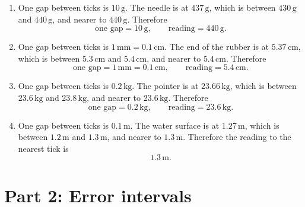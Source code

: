 \documentclass[11pt,a4paper]{article}
\begin{document}
\begin{enumerate}[label=\textbf{Q\arabic*.}, leftmargin=*, itemsep=8pt]
\item 
\begin{solbox}
One gap between ticks is \(10\,\text{g}\). The needle is at \(437\,\text{g}\), which is between \(430\,\text{g}\) and \(440\,\text{g}\), and nearer to \(440\,\text{g}\). Therefore
\[
\boxed{\text{one gap}=10\,\text{g}},\qquad \boxed{\text{reading}=440\,\text{g}}.
\]
\end{solbox}

\item 
\begin{solbox}
One gap between ticks is \(1\,\text{mm}=0.1\,\text{cm}\). The end of the rubber is at \(5.37\,\text{cm}\), which is between \(5.3\,\text{cm}\) and \(5.4\,\text{cm}\), and nearer to \(5.4\,\text{cm}\). Therefore
\[
\boxed{\text{one gap}=1\,\text{mm}=0.1\,\text{cm}},\qquad \boxed{\text{reading}=5.4\,\text{cm}}.
\]
\end{solbox}

\item 
\begin{solbox}
One gap between ticks is \(0.2\,\text{kg}\). The pointer is at \(23.66\,\text{kg}\), which is between \(23.6\,\text{kg}\) and \(23.8\,\text{kg}\), and nearer to \(23.6\,\text{kg}\). Therefore
\[
\boxed{\text{one gap}=0.2\,\text{kg}},\qquad \boxed{\text{reading}=23.6\,\text{kg}}.
\]
\end{solbox}

\item 
\begin{solbox}
One gap between ticks is \(0.1\,\text{m}\). The water surface is at \(1.27\,\text{m}\), which is between \(1.2\,\text{m}\) and \(1.3\,\text{m}\), and nearer to \(1.3\,\text{m}\). Therefore the reading to the nearest tick is
\[
\boxed{1.3\,\text{m}}.
\]
\end{solbox}

\end{enumerate}

\section*{Part 2: Error intervals}
\end{document}
